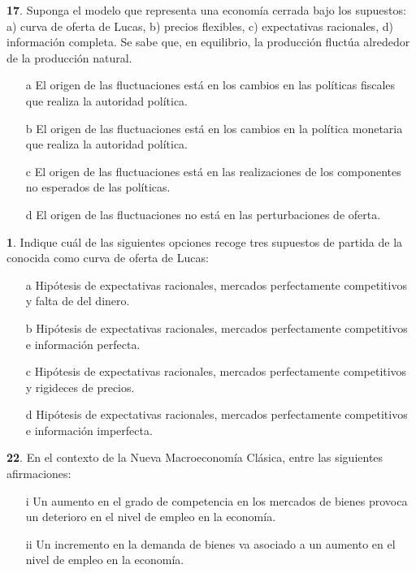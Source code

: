 \documentclass{nuevotema}
\begin{document}
\textbf{17}. Suponga el modelo que representa una economía cerrada bajo los supuestos: a) curva de oferta de Lucas, b) precios flexibles, c) expectativas racionales, d) información completa. Se sabe que, en equilibrio, la producción fluctúa alrededor de la producción natural.

\begin{enumerate}
	\item[a] El origen de las fluctuaciones está en los cambios en las políticas fiscales que realiza la autoridad política.
	\item[b] El origen de las fluctuaciones está en los cambios en la política monetaria que realiza la autoridad política.
	\item[c] El origen de las fluctuaciones está en las realizaciones de los componentes no esperados de las políticas.
	\item[d] El origen de las fluctuaciones no está en las perturbaciones de oferta.
\end{enumerate}

\textbf{1}. Indique cuál de las siguientes opciones recoge tres supuestos de partida de la conocida como curva de oferta de Lucas:
\begin{enumerate}
	\item[a] Hipótesis de expectativas racionales, mercados perfectamente competitivos y falta de  del dinero.
	\item[b] Hipótesis de expectativas racionales, mercados perfectamente competitivos e información perfecta.
	\item[c] Hipótesis de expectativas racionales, mercados perfectamente competitivos y rigideces de precios.
	\item[d] Hipótesis de expectativas racionales, mercados perfectamente competitivos e información imperfecta.
\end{enumerate}

\textbf{22}. En el contexto de la Nueva Macroeconomía Clásica, entre las siguientes afirmaciones: 

\begin{enumerate}
	\item[i] Un aumento en el grado de competencia en los mercados de bienes provoca un deterioro en el nivel de empleo en la economía.
	\item[ii] Un incremento en la demanda de bienes va asociado a un aumento en el nivel de empleo en la economía.
\end{enumerate}
\end{document}
